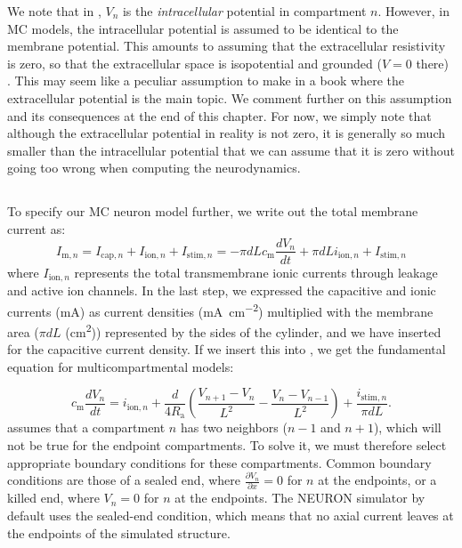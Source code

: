 We note that in , $V_n$ is the \emph{intracellular} potential in compartment $n$. However, in MC models, the intracellular potential is assumed to be identical to the membrane potential. This amounts to assuming that the extracellular resistivity is zero, so that the extracellular space is isopotential and grounded ($V = 0$ there) . This may seem like a peculiar assumption to make in a book where the extracellular potential is the main topic. We comment further on this assumption and its consequences at the end of this chapter. For now, we simply note that although the extracellular potential in reality is not zero, it is generally so much smaller than the intracellular potential that we can assume that it is zero without going too wrong when computing the neurodynamics. 


\subsection{}
\label{sec:Neuron:Active_multicomp}
To specify our MC neuron model further, we write out the total membrane current as:
\begin{equation}
I_{\mathrm{m},n} = I_{\mathrm{cap},n} + I_{\mathrm{ion},n} + I_{\mathrm{stim},n} = -\pi d L c_\text{m} \frac{dV_n}{dt} + \pi d L i_{\mathrm{ion},n} + I_{\mathrm{stim},n}
\label{eq:Neuron:Imemb}
\end{equation}
where $I_{\mathrm{ion},n}$ represents the total transmembrane ionic currents through leakage and active ion channels. In the last step, we expressed the capacitive and ionic currents (\si{\milli\ampere}) as current densities (\si{\milli\ampere\per\square\centi\metre}) multiplied with the membrane area ($\pi d L$ (\si{\square\centi\metre})) represented by the sides of the cylinder, and we have inserted  for the capacitive current density. If we insert this into , we get the fundamental equation for multicompartmental models:

\begin{equation}
c_\text{m} \frac{dV_n}{dt} = i_{\mathrm{ion},n} + \frac{d}{4R_\text{a}}\left(\frac{V_{n+1}-V_n}{L^2} - \frac{V_n-V_{n-1}}{L^2} \right) + \frac{i_{\mathrm{stim},n}}{\pi d L}.
\label{eq:Neuron:multimain}
\end{equation}
 assumes that a compartment $n$ has two neighbors ($n-1$ and $n+1$), which will not be true for the endpoint compartments. To solve it, we must therefore select appropriate boundary conditions for these compartments. Common boundary conditions are those of a sealed end, where $\frac{\partial V_n}{\partial x} = 0$ for $n$ at the endpoints, or a killed end, where $V_n=0$ for $n$ at the endpoints. The NEURON simulator by default uses the sealed-end condition, which means that no axial current leaves at the endpoints of the simulated structure. 


